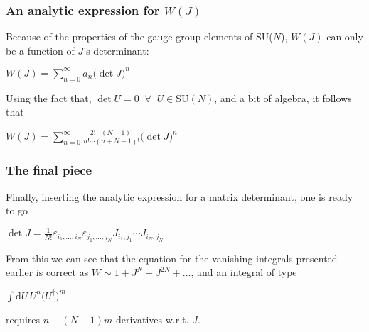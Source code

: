 \documentclass[10pt,a4paper,usenames,dvipsnames]{beamer}
\begin{document}
\begin{frame}
  \frametitle{An analytic expression for $W(J)$}

  Because of the properties of the gauge group elements of SU($N$), $W(J)$ can only be a function of $J$'s determinant:

  \begin{block}{}
    \centering
    $W(J) = \displaystyle\sum_{n=0}^{\infty} a_n \big( \det J \big)^n$
  \end{block}

  Using the fact that, $\det U = 0 \;\; \forall \;\; U \in \mathrm{SU}(N)$, and a bit of algebra, it follows that

  \begin{block}{}
    \centering
    $W(J) = \displaystyle\sum_{n=0}^{\infty} \frac{2! \cdots (N-1)!}{n! \cdots (n + N - 1)!} \big( \det J \big)^n$
  \end{block}

\end{frame}

\begin{frame}
  \frametitle{The final piece}

  Finally, inserting the analytic expression for a matrix determinant, one is ready to go

  \begin{block}{}
    \centering
    $\det J = \displaystyle\frac{1}{N!} \varepsilon_{i_1, \dots, i_N} \varepsilon_{j_1, \dots, j_N} J_{i_1,j_1} \cdots J_{i_N, j_N}$
  \end{block}

  From this we can see that the equation for the vanishing integrals presented earlier is correct as $W \sim 1 + J^N + J^{2N} +
  \dots$, and an integral of type
  
  \begin{block}{}
    \centering
    $\displaystyle\int \mathrm{d} U \, U^n \big( U^{\dagger} \big)^m$
  \end{block}

  requires $n + (N-1) m$ derivatives w.r.t. $J$.
\end{frame}
\end{document}
